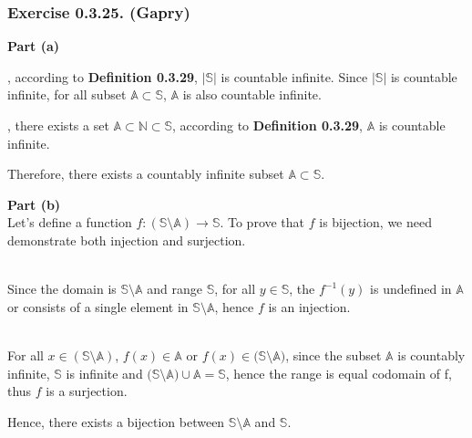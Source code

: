 \subsubsection*{Exercise 0.3.25. (Gapry)}

\begin{flushleft}
\textbf{Part (a)} \\
\vspace{10px}

, according to \textbf{Definition 0.3.29}, $|\mathbb{S}|$ is countable infinite. Since $|\mathbb{S}|$ is countable infinite, for all subset $\mathbb{A} \subset \mathbb{S}$, $\mathbb{A}$ is also countable infinite. \\
\vspace{10px}

, there exists a set $\mathbb{A} \subset \mathbb{N} \subset \mathbb{S}$, according to \textbf{Definition 0.3.29}, $\mathbb{A}$ is countable infinite. \\
\vspace{10px}

Therefore, there exists a countably infinite subset $\mathbb{A} \subset \mathbb{S}$. \\
\vspace{10px}

\textbf{Part (b)} \\
Let's define a function $f: (\mathbb{S \setminus A}) \rightarrow \mathbb{S}$. To prove that $f$ is bijection, we need demonstrate both injection and surjection. \\
\vspace{10px}

 \\
Since the domain is $\mathbb{S \setminus A}$ and range $\mathbb{S}$, for all $y \in \mathbb{S}$, the $f^{-1}(y)$ is undefined in $\mathbb{A}$ or consists of a single element in $\mathbb{S \setminus A}$, hence $f$ is an injection. \\
\vspace{10px}

 \\
For all $x \in (\mathbb{S \setminus A})$, $f(x) \in \mathbb{A}$ or $f(x) \in (\mathbb{S \setminus A)}$, since the subset $\mathbb{A}$ is countably infinite, $\mathbb{S}$ is infinite and $(\mathbb{S \setminus A)} \cup \mathbb{A} = \mathbb{S}$, hence the range is equal codomain of f, thus $f$ is a surjection. \\
\vspace{10px}

Hence, there exists a bijection between $\mathbb{S \setminus A}$ and $\mathbb{S}$.
\end{flushleft}
